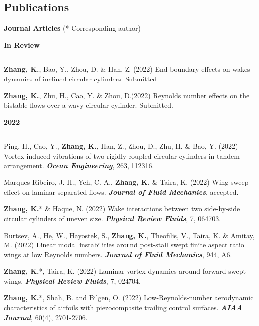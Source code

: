 \documentclass[10pt]{article}
\begin{document}
\subsection*{Publications}
{\bf \color{Blue}Journal Articles} (*  Corresponding author)
{\small
\begin{etaremune}
 \item [] {\bf \color{Blue} In Review \rule{13.8cm}{0.2mm}} 
 
 \item \textbf{Zhang, K.}, Bao, Y., Zhou, D. \& Han, Z. (2022) End boundary effects on wakes dynamics of inclined circular cylinders. Submitted.
 
 \item \textbf{Zhang, K.}, Zhu, H., Cao, Y. \& Zhou, D.(2022) Reynolds number effects on the bistable flows over a wavy circular cylinder. Submitted.



 
 \item [] {\bf \color{Blue} 2022 \rule{14.8cm}{0.2mm}}
 
 \item Ping, H., Cao, Y., \textbf{Zhang, K.}, Han, Z., Zhou, D., Zhu, H. \& Bao, Y. (2022) Vortex-induced vibrations of two rigidly coupled circular cylinders in tandem arrangement. \textit{\textbf{Ocean Engineering}}, 263, 112316. 
 
 \item Marques Ribeiro, J. H., Yeh, C.-A., \textbf{Zhang, K.} \& Taira, K. (2022) Wing sweep effect on laminar separated flows.  \textit{\textbf{Journal of Fluid Mechanics}}, accepted. 

 \item \textbf{Zhang, K.}* \& Haque, N. (2022) Wake interactions between two side-by-side circular cylinders of uneven size.  \textit{\textbf{Physical Review Fluids}}, 7, 064703.

  \item Burtsev, A., He, W., Hayostek, S., \textbf{Zhang, K.}, Theofilis, V., Taira, K. \& Amitay, M. (2022) Linear modal instabilities around post-stall swept finite aspect ratio wings at low Reynolds numbers. \textit{\textbf{Journal of Fluid Mechanics}}, 944, A6.

  \item \textbf{Zhang, K.}*, Taira, K. (2022) Laminar vortex dynamics around forward-swept wings.  \textit{\textbf{Physical Review Fluids}}, 7, 024704.

  \item \textbf{Zhang, K.}*, Shah, B. and Bilgen, O. (2022) Low-Reynolds-number aerodynamic characteristics of airfoils with piezocomposite trailing control surfaces. \textit{\textbf{AIAA Journal}}, 60(4), 2701-2706.


\end{etaremune}}
\end{document}
